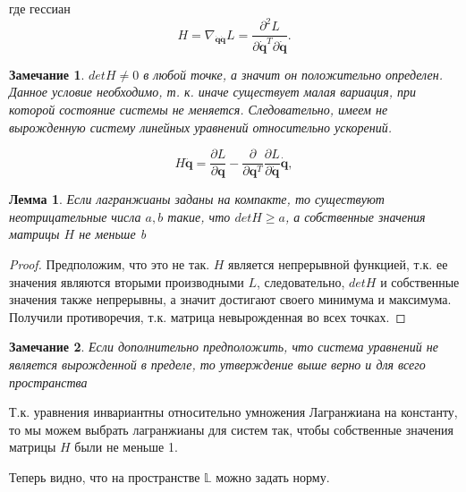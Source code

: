 \documentclass[a4paper, 12pt]{article}
\renewcommand{\ge}{\ensuremath{\geqslant}}
\newtheorem{remark}{Замечание}
\newtheorem{lemma}{Лемма}
\begin{document}
где гессиан 
\begin{equation}
H = \nabla_{\dot{\mathbf{q}}\dot{\mathbf{q}}} L = \frac{\partial^{2} L}{\partial \dot{\mathbf{q}}^T \partial \dot{\mathbf{q}}}.
\end{equation}
\begin{remark} \label{remark1}
$det H \neq 0$ в любой точке, а значит он положительно определен. Данное условие необходимо, т. к. иначе существует малая вариация, при которой состояние системы не меняется. Следовательно, имеем не вырожденную систему линейных уравнений относительно ускорений.

\begin{equation}
\label{eq:linear_equation_acc}
H\ddot{\mathbf{q}} 
= \frac{\partial L}{\partial \mathbf{q}}-\frac{\partial}{\partial \mathbf{q}^T} \frac{\partial L}{\partial \dot{\mathbf{q}}} \dot{\mathbf{q}},
\end{equation}

\end{remark}

\begin{lemma} \label{lemma1}
Если лагранжианы заданы на компакте, то существуют неотрицательные числа $a, b$ такие, что $det H \ge a$, а собственные значения матрицы $H$ не меньше b
\end{lemma}
\begin{proof}
Предположим, что это не так. $H$ является непрерывной функцией, т.к. ее значения являются вторыми производными $L$, следовательно, $det H$ и собственные значения также непрерывны, а значит достигают своего минимума и максимума. Получили противоречия, т.к. матрица невырожденная во всех точках.
\end{proof}

\begin{remark} \label{remark2}
Если дополнительно предположить, что система уравнений не является вырожденной в пределе, то утверждение выше верно и для всего пространства
\end{remark}

Т.к. уравнения инвариантны относительно умножения Лагранжиана на константу, то мы можем выбрать лагранжианы для систем так, чтобы собственные значения матрицы $H$ были не меньше 1.

Теперь видно, что на пространстве $\mathbb{L}$ можно задать норму. 
\end{document}

